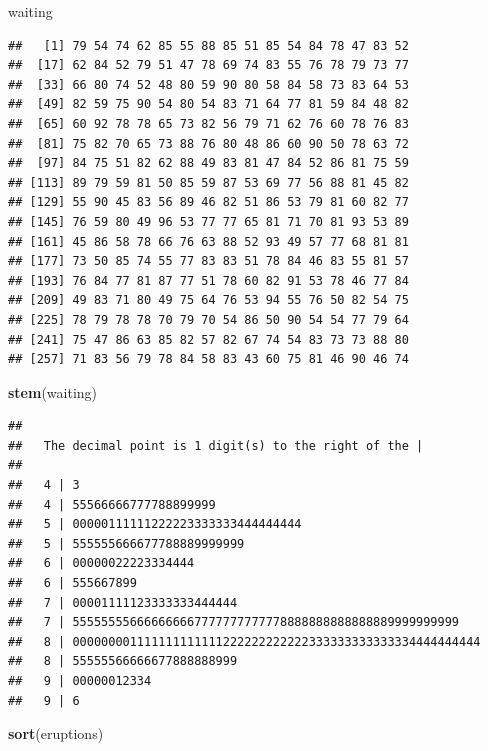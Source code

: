 \documentclass[11pt,]{krantz}
\makeatletter
\newenvironment{Shaded}{\begin{snugshade}}{\end{snugshade}}
\newcommand{\KeywordTok}[1]{\textcolor[rgb]{0.13,0.29,0.53}{\textbf{#1}}}
\newcommand{\NormalTok}[1]{#1}
\newenvironment{kframe}{%
\medskip{}
\setlength{\fboxsep}{.8em}
 \def\at@end@of@kframe{}%
 \ifinner\ifhmode%
  \def\at@end@of@kframe{\end{minipage}}%
  \begin{minipage}{\columnwidth}%
 \fi\fi%
 \def\FrameCommand##1{\hskip\@totalleftmargin \hskip-\fboxsep
 \colorbox{shadecolor}{##1}\hskip-\fboxsep
     \hskip-\linewidth \hskip-\@totalleftmargin \hskip\columnwidth}%
 \MakeFramed {\advance\hsize-\width
   \@totalleftmargin\z@ \linewidth\hsize
   \@setminipage}}%
 {\par\unskip\endMakeFramed%
 \at@end@of@kframe}
\renewenvironment{Shaded}{\begin{kframe}}{\end{kframe}}
\theoremstyle{definition}
\theoremstyle{definition}
\theoremstyle{remark}
\makeatother
\begin{document}
\begin{Shaded}
\begin{Highlighting}[]
\NormalTok{waiting}
\end{Highlighting}
\end{Shaded}

\begin{verbatim}
##   [1] 79 54 74 62 85 55 88 85 51 85 54 84 78 47 83 52
##  [17] 62 84 52 79 51 47 78 69 74 83 55 76 78 79 73 77
##  [33] 66 80 74 52 48 80 59 90 80 58 84 58 73 83 64 53
##  [49] 82 59 75 90 54 80 54 83 71 64 77 81 59 84 48 82
##  [65] 60 92 78 78 65 73 82 56 79 71 62 76 60 78 76 83
##  [81] 75 82 70 65 73 88 76 80 48 86 60 90 50 78 63 72
##  [97] 84 75 51 82 62 88 49 83 81 47 84 52 86 81 75 59
## [113] 89 79 59 81 50 85 59 87 53 69 77 56 88 81 45 82
## [129] 55 90 45 83 56 89 46 82 51 86 53 79 81 60 82 77
## [145] 76 59 80 49 96 53 77 77 65 81 71 70 81 93 53 89
## [161] 45 86 58 78 66 76 63 88 52 93 49 57 77 68 81 81
## [177] 73 50 85 74 55 77 83 83 51 78 84 46 83 55 81 57
## [193] 76 84 77 81 87 77 51 78 60 82 91 53 78 46 77 84
## [209] 49 83 71 80 49 75 64 76 53 94 55 76 50 82 54 75
## [225] 78 79 78 78 70 79 70 54 86 50 90 54 54 77 79 64
## [241] 75 47 86 63 85 82 57 82 67 74 54 83 73 73 88 80
## [257] 71 83 56 79 78 84 58 83 43 60 75 81 46 90 46 74
\end{verbatim}

\begin{Shaded}
\begin{Highlighting}[]
\KeywordTok{stem}\NormalTok{(waiting)}
\end{Highlighting}
\end{Shaded}

\begin{verbatim}
## 
##   The decimal point is 1 digit(s) to the right of the |
## 
##   4 | 3
##   4 | 55566666777788899999
##   5 | 00000111111222223333333444444444
##   5 | 555555666677788889999999
##   6 | 00000022223334444
##   6 | 555667899
##   7 | 00001111123333333444444
##   7 | 555555556666666667777777777778888888888888889999999999
##   8 | 000000001111111111111222222222222333333333333334444444444
##   8 | 55555566666677888888999
##   9 | 00000012334
##   9 | 6
\end{verbatim}

\begin{Shaded}
\begin{Highlighting}[]
\KeywordTok{sort}\NormalTok{(eruptions)}
\end{Highlighting}
\end{Shaded}
\end{document}
